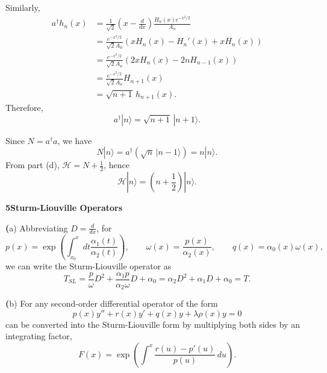 \documentclass[12pt]{article}
\newcommand{\problem}[2]{%
    \par\vspace{1em}
    \noindent\textbf{#1\quad #2}
    \par\smallskip
}
\begin{document}
Similarly,
\begin{equation}
\begin{aligned}
a^\dagger h_n(x)
&= \frac{1}{\sqrt{2}}\left(x-\frac{d}{dx}\right)
   \frac{H_n(x)e^{-x^2/2}}{A_n}\\
&= \frac{e^{-x^2/2}}{\sqrt{2}A_n}
   \left(xH_n(x)-H_n'(x)+xH_n(x)\right)\\
&= \frac{e^{-x^2/2}}{\sqrt{2}A_n}
   \left(2xH_n(x)-2nH_{n-1}(x)\right)\\
&= \frac{e^{-x^2/2}}{\sqrt{2}A_n}H_{n+1}(x)\\
&= \sqrt{n+1}\,h_{n+1}(x).
\end{aligned}
\end{equation}
Therefore,
\begin{equation}
a^\dagger|n\rangle = \sqrt{n+1}\,|n+1\rangle.
\end{equation}

Since $N=a^\dagger a$, we have
\begin{equation}
N|n\rangle
= a^\dagger\left(\sqrt{n}\,|n-1\rangle\right)
= n|n\rangle.
\end{equation}
From part (d), $\mathcal{H}=N+\frac{1}{2}$, hence
\begin{equation}
\mathcal{H}|n\rangle
= \left(n+\frac{1}{2}\right)|n\rangle.
\end{equation}

\pagebreak
\problem{5}{Sturm-Liouville Operators}
\noindent\textbf({a}) \quad Abbreviating $D = \tfrac{d}{dx}$, for 
\begin{equation}
    p(x) = \exp{\left(\int_{x_0}^{x}dt \frac{\alpha_1(t)}{\alpha_2(t)}\right)}, \qquad
    \omega(x) = \frac{p(x)}{\alpha_2(x)}, \qquad
    q(x) = \alpha_0(x)\omega(x),
\end{equation}
we can write the Sturm-Liouville operator as
\begin{equation}
    T_{SL} = \frac{p}{\omega}D^2 + \frac{\alpha_1p}{\alpha_2\omega}D + \alpha_0 = \alpha_2D^2 + \alpha_1D + \alpha_0 = T.
\end{equation}

\noindent\textbf({b}) \quad For any second-order differential operator of the form
\begin{equation}
    p(x)y'' + r(x)y' + q(x)y + \lambda \rho(x) y = 0
    \label{eq:SL}
\end{equation}
can be converted into the Sturm-Liouville form by multiplying both sides by an integrating factor,
\begin{equation}
    F(x) = \exp\left(\int^x \frac{r(u)-p'(u)}{p(u)}\,du\right).
\end{equation}
\end{document}
